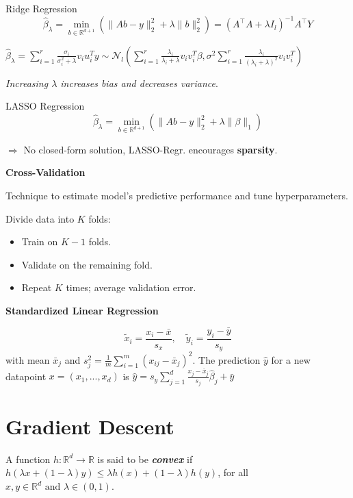\documentclass[a4paper,10pt]{article}
\newcommand{\subtitle}[1]{\begin{normalsize}\vspace{0.25cm}\textbf{#1} \end{normalsize}}
\begin{document}
\begin{small}
\begin{subbox}{Ridge Regression}
    $$\hat{\beta}_\lambda = \min_{b \in \mathbb{R}^{d+1}} \left( \|A b - y\|_2^2 + \lambda \|b\|_2^2 \right) = (A^\top A + \lambda I_l)^{-1} A^\top Y$$
\end{subbox}

\begin{footnotesize}
$\hat{\beta}_\lambda =  \sum_{i=1}^{r} \frac{\sigma_i}{\sigma_i^2 + \lambda} v_i u_i^T y \sim \mathcal{N}_l \left( \sum_{i=1}^{r} \frac{\lambda_i}{\lambda_i + \lambda} v_i v_i^T \beta, \sigma^2 \sum_{i=1}^{r} \frac{\lambda_i}{(\lambda_i + \lambda)^2} v_i v_i^T \right)$
\end{footnotesize}
\textit{Increasing \( \lambda \) increases bias and decreases variance}. 

\begin{subbox}{LASSO Regression}
\[
\hat{\beta}_\lambda = \min_{b \in \mathbb{R}^{d+1}} \left( \|A b - y\|_2^2 + \lambda \| \beta \|_1 \right)
\]
\end{subbox}
$\Rightarrow$ No closed-form solution, LASSO-Regr. encourages \textbf{sparsity}.

\subtitle{Cross-Validation}

Technique to estimate model's predictive performance and tune hyperparameters.
\begin{subbox_noTitle}
Divide data into \( K \) folds:
\begin{itemize}
    \item Train on \( K-1 \) folds.
    \item Validate on the remaining fold.
    \item Repeat \( K \) times; average validation error.
\end{itemize}
\end{subbox_noTitle}

\subtitle{Standardized Linear Regression} 
\[
\tilde{x}_i = \frac{x_i - \bar{x}}{s_x}, \quad  \tilde{y}_i = \frac{y_i - \bar{y}}{s_y}
\]
with mean \( \bar{x}_j \) and $s_j^2 = \frac{1}{m} \sum_{i=1}^{m} \left( x_{ij} - \bar{x}_j \right)^2$. The prediction $\hat{y}$ for a new datapoint $x=(x_1,...,x_d)$ is $\hat{y} = s_y \sum_{j=1}^{d} \frac{x_j - \bar{x}_j}{s_j} \hat{\beta}_j + \bar{y}$

\section{Gradient Descent}

A function $ h : \mathbb{R}^d \to \mathbb{R}$ is said to be \textbf{\textit{convex}} if $
h(\lambda x + (1 - \lambda) y) \leq \lambda h(x) + (1 - \lambda) h(y)$, for all $ x, y \in \mathbb{R}^d \text{ and } \lambda \in (0,1)$.


\end{small}
\end{document}
